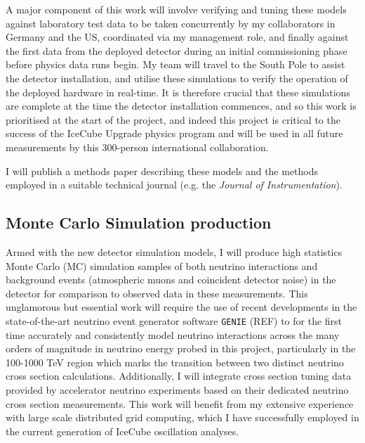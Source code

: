 \documentclass[a4paper,11pt]{article}
\begin{document}
A major component of this work will involve verifying and tuning these models against laboratory test data to be taken concurrently by my collaborators in Germany and the US, coordinated via my management role, and finally against the first data from the deployed detector during an initial commissioning phase before physics data runs begin. My team will travel to the South Pole to assist the detector installation, and utilise these simulations to verify the operation of the deployed hardware in real-time. It is therefore crucial that these simulations are complete at the time the detector installation commences, and so this work is prioritised at the start of the project, and indeed this project is critical to the success of the IceCube Upgrade physics program and will be used in all future measurements by this 300-person international collaboration.  

I will publish a methods paper describing these models and the methods employed in a suitable technical journal (e.g. the \textit{Journal of Instrumentation}). \\


\subsection{Monte Carlo Simulation production}

Armed with the new detector simulation models, I will produce high statistics Monte Carlo (MC) simulation samples of both neutrino interactions and background events (atmospheric muons and coincident detector noise) in the detector for comparison to observed data in these measurements. This unglamorous but essential work will require the use of recent developments in the state-of-the-art neutrino event generator software \texttt{GENIE} (REF) to for the first time accurately and consistently model neutrino interactions across the many orders of magnitude in neutrino energy probed in this project, particularly in the 100-1000 TeV region which marks the transition between two distinct neutrino cross section calculations. Additionally, I will integrate cross section tuning data provided by accelerator neutrino experiments based on their dedicated neutrino cross section measurements. This work will benefit from my extensive experience with large scale distributed grid computing, which I have successfully employed in the current generation of IceCube oscillation analyses.
\end{document}
